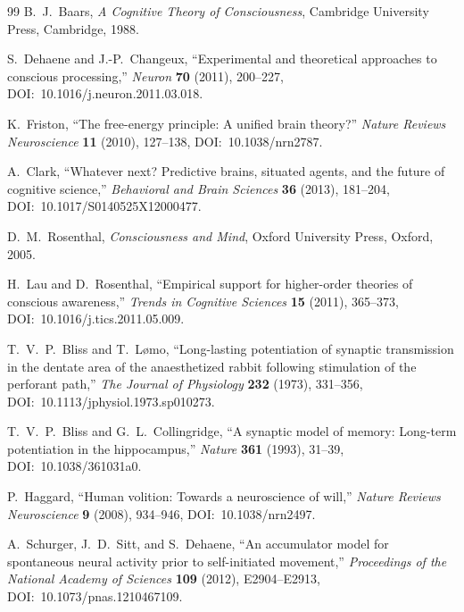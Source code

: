 \documentclass[12pt]{article}
\theoremstyle{definition}
\theoremstyle{remark}
\begin{document}
\begin{thebibliography}{99}
B.~J.~Baars,
\emph{A Cognitive Theory of Consciousness},
Cambridge University Press, Cambridge, 1988.

S.~Dehaene and J.-P.~Changeux,
``Experimental and theoretical approaches to conscious processing,''
\emph{Neuron} \textbf{70} (2011), 200--227,
DOI:~10.1016/j.neuron.2011.03.018.

K.~Friston,
``The free-energy principle: A unified brain theory?''
\emph{Nature Reviews Neuroscience} \textbf{11} (2010), 127--138,
DOI:~10.1038/nrn2787.

A.~Clark,
``Whatever next? Predictive brains, situated agents, and the future of
cognitive science,''
\emph{Behavioral and Brain Sciences} \textbf{36} (2013), 181--204,
DOI:~10.1017/S0140525X12000477.

D.~M.~Rosenthal,
\emph{Consciousness and Mind},
Oxford University Press, Oxford, 2005.

H.~Lau and D.~Rosenthal,
``Empirical support for higher-order theories of conscious awareness,''
\emph{Trends in Cognitive Sciences} \textbf{15} (2011), 365--373,
DOI:~10.1016/j.tics.2011.05.009.

T.~V.~P.~Bliss and T.~L{\o}mo,
``Long-lasting potentiation of synaptic transmission in the dentate
area of the anaesthetized rabbit following stimulation of the perforant
path,''
\emph{The Journal of Physiology} \textbf{232} (1973), 331--356,
DOI:~10.1113/jphysiol.1973.sp010273.

T.~V.~P.~Bliss and G.~L.~Collingridge,
``A synaptic model of memory: Long-term potentiation in the
hippocampus,''
\emph{Nature} \textbf{361} (1993), 31--39,
DOI:~10.1038/361031a0.

P.~Haggard,
``Human volition: Towards a neuroscience of will,''
\emph{Nature Reviews Neuroscience} \textbf{9} (2008), 934--946,
DOI:~10.1038/nrn2497.

A.~Schurger, J.~D.~Sitt, and S.~Dehaene,
``An accumulator model for spontaneous neural activity prior to
self-initiated movement,''
\emph{Proceedings of the National Academy of Sciences} \textbf{109}
(2012), E2904--E2913,
DOI:~10.1073/pnas.1210467109.

\end{thebibliography}
\end{document}
